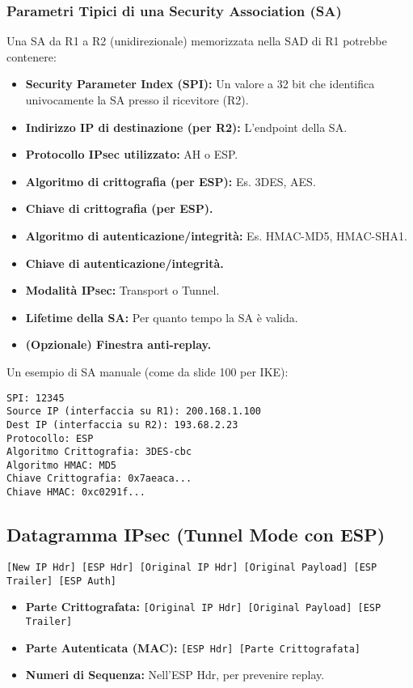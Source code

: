 \subsubsection{Parametri Tipici di una Security Association (SA)}
\label{ssubsec:sa_parameters}
Una SA da R1 a R2 (unidirezionale) memorizzata nella SAD di R1 potrebbe contenere:
\begin{itemize}
    \item \textbf{Security Parameter Index (SPI):} Un valore a 32 bit che identifica univocamente la SA presso il ricevitore (R2).
    \item \textbf{Indirizzo IP di destinazione (per R2):} L'endpoint della SA.
    \item \textbf{Protocollo IPsec utilizzato:} AH o ESP.
    \item \textbf{Algoritmo di crittografia (per ESP):} Es. 3DES, AES.
    \item \textbf{Chiave di crittografia (per ESP).}
    \item \textbf{Algoritmo di autenticazione/integrità:} Es. HMAC-MD5, HMAC-SHA1.
    \item \textbf{Chiave di autenticazione/integrità.}
    \item \textbf{Modalità IPsec:} Transport o Tunnel.
    \item \textbf{Lifetime della SA:} Per quanto tempo la SA è valida.
    \item \textbf{(Opzionale) Finestra anti-replay.}
\end{itemize}
Un esempio di SA manuale (come da slide 100 per IKE):
\begin{verbatim}
SPI: 12345
Source IP (interfaccia su R1): 200.168.1.100
Dest IP (interfaccia su R2): 193.68.2.23
Protocollo: ESP
Algoritmo Crittografia: 3DES-cbc
Algoritmo HMAC: MD5
Chiave Crittografia: 0x7aeaca...
Chiave HMAC: 0xc0291f...
\end{verbatim}

\subsection{Datagramma IPsec (Tunnel Mode con ESP)}
\texttt{[New IP Hdr] [ESP Hdr] [Original IP Hdr] [Original Payload] [ESP Trailer] [ESP Auth]}
\begin{itemize}
    \item \textbf{Parte Crittografata:} \texttt{[Original IP Hdr] [Original Payload] [ESP Trailer]}
    \item \textbf{Parte Autenticata (MAC):} \texttt{[ESP Hdr] [Parte Crittografata]}
    \item \textbf{Numeri di Sequenza:} Nell'ESP Hdr, per prevenire replay.
\end{itemize}

